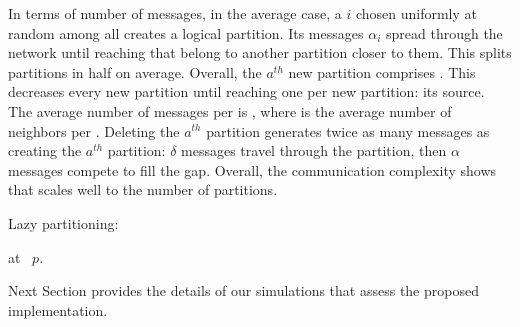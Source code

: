In terms of number of messages, in the average case, a \process $i$
chosen uniformly at random among all \processes creates a logical
partition. Its messages $\alpha_i$ spread through the network until
reaching \processes that belong to another partition closer to
them. This splits partitions in half on average. Overall, the $a^{th}$
new partition comprises  \processes. This decreases every new
partition until reaching one \process per new partition: its
source. The average number of messages per \process is
, where  is the average
number of neighbors per \process.
Deleting the $a^{th}$ partition generates twice as many messages as
creating the $a^{th}$ partition: $\delta$ messages travel through the
partition, then $\alpha$ messages compete to fill the gap.  Overall,
the communication complexity shows that \NAME scales well to the
number of partitions.


\begin{asparadesc}
\item [Lazy partitioning:] 
\end{asparadesc}


\begin{algorithm}
  
  \caption{\label{algo:xascast}\NAMEC at \Process~$p$. }
\end{algorithm}

Next Section provides the details of our simulations that assess the
proposed implementation.


